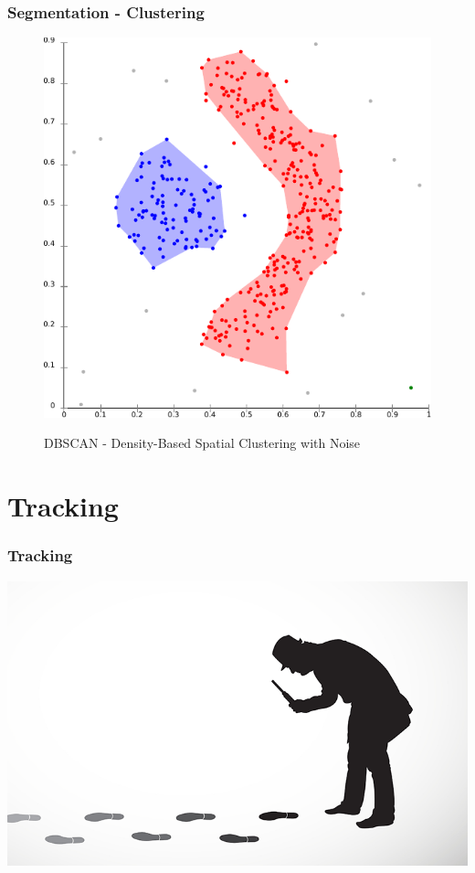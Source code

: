 \documentclass[nosymbols]{beamer}	%
\begin{document}
\begin{frame}
\frametitle{Segmentation - Clustering}
\begin{figure}[!ht]
\begin{center}
\caption{DBSCAN - Density-Based Spatial Clustering with Noise}
\includegraphics[width=\textwidth,height=0.7\textheight,keepaspectratio]{bilder/DBSCAN-density-data.pdf}%
\label{dbscan}
\end{center}
\end{figure}
\end{frame}


\section{Tracking}

\begin{frame}
\frametitle{Tracking}
\begin{center}
\includegraphics[width=\textwidth,height=0.7\textheight,keepaspectratio]{bilder/detective-tracking.png} %
\end{center}
\end{frame}
\end{document}
